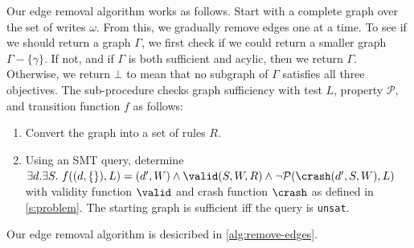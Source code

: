Our edge removal algorithm works as follows.
Start with a complete graph over the set of writes $\omega$. From this, we gradually remove
edges one at a time. To see if we should return a graph $\Gamma$, we first check
if we could return a smaller graph $\Gamma - \{\gamma\}$. If not, and if
$\Gamma$ is both sufficient and acylic, then we return $\Gamma$. Otherwise,
we return $\bot$ to mean that no subgraph of $\Gamma$ satisfies all three objectives.
The sub-procedure \graphsuff checks graph sufficiency with test $L$, property $\mathcal{P}$,
and transition function $f$ as follows:
\begin{enumerate}
  \item Convert the graph into a set of rules $R$.
  \item Using an SMT query, determine
    $\exists d.\exists S.\  
       f((d,\{\}), L) = (d', W)
       \wedge \valid(S,W,R)
       \wedge \neg\mathcal{P}(\crash(d',S,W), L)$
       with validity function $\valid$ and crash function $\crash$ as defined in \autoref{s:problem}.
       The starting graph is sufficient iff the query is \texttt{unsat}.
\end{enumerate}
Our edge removal algorithm is desicribed in \autoref{alg:remove-edges}.



